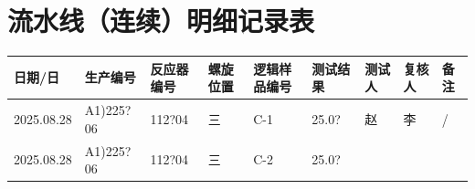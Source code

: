 \documentclass[UTF8,10pt,a4paper,fontset=fandol]{ctexart}
\newcommand{\fieldvalue}[1]{#1}
\newcommand{\handwritten}[1]{#1}
\begin{document}
\newpage

\section*{流水线（连续）明细记录表}

\small
\begin{tabular}{|p{1.55cm}|p{2.05cm}|p{1.35cm}|p{1.35cm}|p{1.55cm}|p{1.45cm}|p{1.25cm}|p{1.25cm}|p{1.20cm}|}
\hline
日期/日 & 生产编号 & 反应器编号 & 螺旋位置 & 逻辑样品编号 & 测试结果 & 测试人 & 复核人 & 备注 \\
\hline
\fieldvalue{\handwritten{2025.08.28}} &
\fieldvalue{\handwritten{A1)225?06}} &
\fieldvalue{\handwritten{112?04}} &
\fieldvalue{\handwritten{三}} &
\fieldvalue{\handwritten{C-1}} &
\fieldvalue{\handwritten{25.0?}} &
\fieldvalue{\handwritten{赵}} &
\fieldvalue{\handwritten{李}} &
\fieldvalue{\handwritten{/}} \\
\hline
\fieldvalue{\handwritten{2025.08.28}} &
\fieldvalue{\handwritten{A1)225?06}} &
\fieldvalue{\handwritten{112?04}} &
\fieldvalue{\handwritten{三}} &
\fieldvalue{\handwritten{C-2}} &
\fieldvalue{\handwritten{25.0?}} &

\end{tabular}
\end{document}
